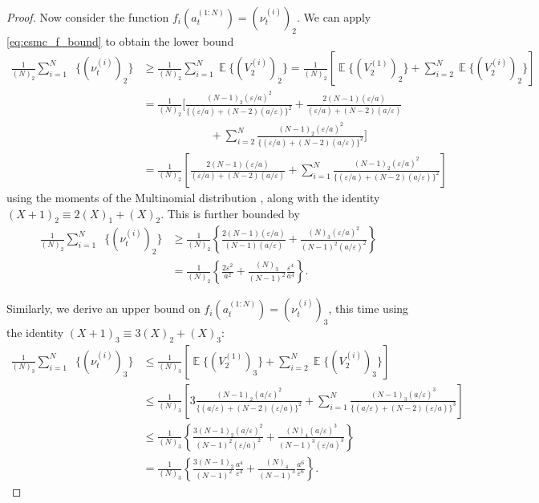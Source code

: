 \documentclass{article}
\theoremstyle{definition}
\DeclareMathOperator{\E}{\mathbb{E}}
\DeclareMathOperator{\Et}{\mathbb{E}_t}
\newcommand{\1}[1]{\mathbbm{1}_{\{#1\}}}
\begin{document}
\begin{proof}
Now consider the function $f_i(a_t^{(1:N)}) = (\nu_t^{(i)})_2$. We can apply \eqref{eq:csmc_f_bound} to obtain the lower bound
\begin{align*}
\frac{1}{(N)_2} \sum_{i=1}^N \Et\{ (\nu_t^{(i)})_2 \} 
&\geq \frac{1}{(N)_2} \sum_{i=1}^N \E\{ (V_2^{(i)})_2 \} 
=  \frac{1}{(N)_2} \left[ \E\{ (V_2^{(1)})_2 \} + \sum_{i=2}^N \E\{ (V_2^{(i)})_2 \} \right] \\
&= \frac{1}{(N)_2} \Bigg[ \frac{(N-1)_2 (\varepsilon/a)^2}{\{(\varepsilon/a) + (N-2)(a/\varepsilon)\}^2} + \frac{2(N-1)(\varepsilon/a)}{(\varepsilon/a) + (N-2)(a/\varepsilon)}  \\
&\qquad\qquad\qquad + \sum_{i=2}^N \frac{(N-1)_2 (\varepsilon/a)^2}{\{(\varepsilon/a) + (N-2)(a/\varepsilon)\}^2} \Bigg] \\
&= \frac{1}{(N)_2} \left[ \frac{2(N-1)(\varepsilon/a)}{(\varepsilon/a) + (N-2)(a/\varepsilon)} + \sum_{i=1}^N \frac{(N-1)_2 (\varepsilon/a)^2}{\{(\varepsilon/a) + (N-2)(a/\varepsilon)\}^2} \right]
\end{align*}
using the moments of the Multinomial distribution \citep{mosimann1962}, along with the identity $(X+1)_2 \equiv 2(X)_1 +(X)_2$.
This is further bounded by
\begin{align}
\frac{1}{(N)_2} \sum_{i=1}^N \Et\{(\nu_t^{(i)})_2\} 
&\geq \frac{1}{(N)_2} \left\{ \frac{2(N-1)(\varepsilon/a)}{(N-1)(a/\varepsilon)} + \frac{(N)_3 (\varepsilon/a)^2}{(N-1)^2(a/\varepsilon)^2} \right\} \nonumber\\
&= \frac{1}{(N)_2} \left\{\frac{2\varepsilon^2}{a^2} + \frac{(N)_3}{(N-1)^2}\frac{\varepsilon^4}{a^4}  \right\} . \label{eq:CSMC_cN_LB}
\end{align}

Similarly, we derive an upper bound on $f_i(a_t^{(1:N)}) = (\nu_t^{(i)})_3$, this time using the identity $(X+1)_3 \equiv 3(X)_2 +(X)_3 $:
\begin{align*}
\frac{1}{(N)_3} \sum_{i=1}^N \Et\{(\nu_t^{(i)})_3\} 
&\leq \frac{1}{(N)_3} \left[ \E\{(V_2^{(1)})_3\} + \sum_{i=2}^N \E\{(V_2^{(i)})_3\} \right] \\
&\leq \frac{1}{(N)_3} \left[ 3 \frac{(N-1)_2 (a/\varepsilon)^2}{\{(a/\varepsilon) + (N-2)(\varepsilon/a)\}^2} + \sum_{i=1}^N \frac{(N-1)_3 (a/\varepsilon)^3}{\{(a/\varepsilon) + (N-2)(\varepsilon/a)\}^3} \right] \\
&\leq \frac{1}{(N)_3} \left\{ \frac{3(N-1)_2 (a/\varepsilon)^2}{(N-1)^2 (\varepsilon/a)^2} + \frac{(N)_4 (a/\varepsilon)^3}{(N-1)^3 (\varepsilon/a)^3} \right\} \\
&= \frac{1}{(N)_3} \left\{ \frac{3(N-1)_2}{(N-1)^2} \frac{a^4}{\varepsilon^4} +\frac{(N)_4}{(N-1)^3} \frac{a^6}{\varepsilon^6} \right\}.
\end{align*}


\end{proof}
\end{document}
